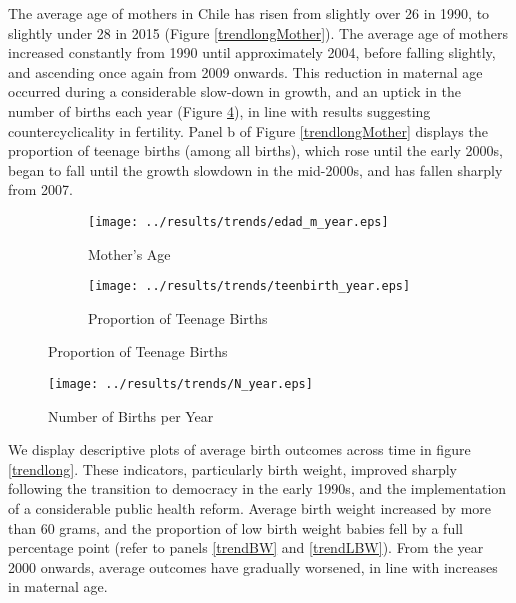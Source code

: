 \documentclass[12pt]{article}
\begin{document}
\begin{spacing}{1.4}
The average age of mothers in Chile has risen from slightly over 26 in
1990, to slightly under 28 in 2015 (Figure \ref{trendlongMother}).  The
average age of mothers increased constantly from 1990 until approximately
2004, before falling slightly, and ascending once again from 2009 onwards.
This reduction in maternal age occurred during a considerable slow-down
in growth, and an uptick in the number of births each year (Figure
\ref{NBirths}), in line with results suggesting countercyclicality in
fertility.  Panel b of Figure \ref{trendlongMother} displays the proportion
of teenage births (among all births), which rose until the early 2000s,
began to fall until the growth slowdown in the mid-2000s, and has fallen
sharply from 2007.
\begin{figure}[htpb!]
  \begin{center}
    \caption{Trends in Maternal Characteristics in Chile}
    \label{trendlongMother}
    \begin{subfigure}{.5\textwidth}
      \centering
      \texttt{[image: ../results/trends/edad\_m\_year.eps]}
      \caption{Mother's Age}
      \label{trendMAge}
    \end{subfigure}%
    \begin{subfigure}{.5\textwidth}
      \centering
      \texttt{[image: ../results/trends/teenbirth\_year.eps]}
      \caption{Proportion of Teenage Births}
      \label{placebo-lbw}
    \end{subfigure}
  \end{center}
\end{figure}

\begin{figure}[htpb!]
  \begin{center}
    \caption{Number of Births per Year}
    \label{NBirths}
    \texttt{[image: ../results/trends/N\_year.eps]}
  \end{center}
\end{figure}

We display descriptive plots of average birth outcomes across time in
figure \ref{trendlong}.  These indicators, particularly birth weight,
improved sharply following the transition to democracy in the early
1990s, and the implementation of a considerable public health reform.
Average birth weight increased by more than 60 grams, and the proportion
of low birth weight babies fell by a full percentage point (refer to
panels \ref{trendBW} and \ref{trendLBW}).  From the year 2000 onwards,
average outcomes have gradually worsened, in line with increases in
maternal age.


\end{spacing}
\end{document}
